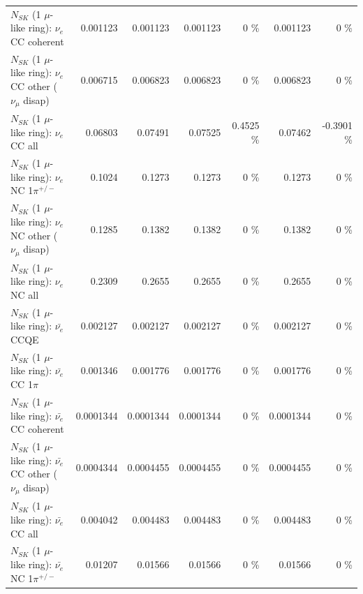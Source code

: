 \begin{table}
\begin{tabular}{| l | r | r | r  r | r  r |}
                               $N_{SK}$ (1 $\mu$-like ring): $\nu_e$ CC coherent &        0.001123 &        0.001123 &        0.001123 &        0 \%  &        0.001123 &        0 \%  \\ 
                $N_{SK}$ (1 $\mu$-like ring): $\nu_e$ CC other ($\nu_\mu$ disap) &        0.006715 &        0.006823 &        0.006823 &        0 \%  &        0.006823 &        0 \%  \\ 
                                  $N_{SK}$ (1 $\mu$-like ring): $\nu_{e}$ CC all &         0.06803 &         0.07491 &         0.07525 &   0.4525 \%  &         0.07462 &  -0.3901 \%  \\ 
\hline
                           $N_{SK}$ (1 $\mu$-like ring): $\nu_e$ NC 1$\pi^{+/-}$ &          0.1024 &          0.1273 &          0.1273 &        0 \%  &          0.1273 &        0 \%  \\ 
                $N_{SK}$ (1 $\mu$-like ring): $\nu_e$ NC other ($\nu_\mu$ disap) &          0.1285 &          0.1382 &          0.1382 &        0 \%  &          0.1382 &        0 \%  \\ 
                                  $N_{SK}$ (1 $\mu$-like ring): $\nu_{e}$ NC all &          0.2309 &          0.2655 &          0.2655 &        0 \%  &          0.2655 &        0 \%  \\ 
\hline
\hline
\hline
                                $N_{SK}$ (1 $\mu$-like ring): $\bar{\nu_e}$ CCQE &        0.002127 &        0.002127 &        0.002127 &        0 \%  &        0.002127 &        0 \%  \\ 
                           $N_{SK}$ (1 $\mu$-like ring): $\bar{\nu_e}$ CC 1$\pi$ &        0.001346 &        0.001776 &        0.001776 &        0 \%  &        0.001776 &        0 \%  \\ 
                         $N_{SK}$ (1 $\mu$-like ring): $\bar{\nu_e}$ CC coherent &       0.0001344 &       0.0001344 &       0.0001344 &        0 \%  &       0.0001344 &        0 \%  \\ 
          $N_{SK}$ (1 $\mu$-like ring): $\bar{\nu_e}$ CC other ($\nu_\mu$ disap) &       0.0004344 &       0.0004455 &       0.0004455 &        0 \%  &       0.0004455 &        0 \%  \\ 
                            $N_{SK}$ (1 $\mu$-like ring): $\bar{\nu_{e}}$ CC all &        0.004042 &        0.004483 &        0.004483 &        0 \%  &        0.004483 &        0 \%  \\ 
\hline
                     $N_{SK}$ (1 $\mu$-like ring): $\bar{\nu_e}$ NC 1$\pi^{+/-}$ &         0.01207 &         0.01566 &         0.01566 &        0 \%  &         0.01566 &        0 \%  \\ 

\end{tabular}
\end{table}
